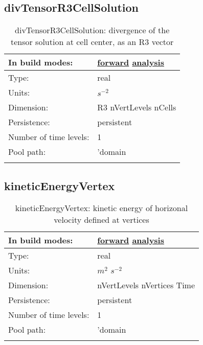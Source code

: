 \subsection[divTensorR3CellSolution]{divTensorR3CellSolution}
\label{subsec:var_sec_scratch_divTensorR3CellSolution}
\begin{center}
\begin{longtable}{| p{2.0in} | p{4.0in} |}
        \hline 
        In build modes: & \hyperref[subsec:forward_var_tab_scratch]{forward} \hyperref[subsec:analysis_var_tab_scratch]{analysis} \\
        \hline 
        Type: & real \\
        \hline 
        Units: & $s^{-2}$ \\
        \hline 
        Dimension: & R3 nVertLevels nCells \\
        \hline 
        Persistence: & persistent \\
        \hline 
        Number of time levels: & 1 \\
        \hline 
            Pool path: & 'domain %
 \\
		 \hline 
    \caption{divTensorR3CellSolution: divergence of the tensor solution at cell center, as an R3 vector}
\end{longtable}
\end{center}
\subsection[kineticEnergyVertex]{kineticEnergyVertex}
\label{subsec:var_sec_scratch_kineticEnergyVertex}
\begin{center}
\begin{longtable}{| p{2.0in} | p{4.0in} |}
        \hline 
        In build modes: & \hyperref[subsec:forward_var_tab_scratch]{forward} \hyperref[subsec:analysis_var_tab_scratch]{analysis} \\
        \hline 
        Type: & real \\
        \hline 
        Units: & $m^2$ $s^{-2}$ \\
        \hline 
        Dimension: & nVertLevels nVertices Time \\
        \hline 
        Persistence: & persistent \\
        \hline 
        Number of time levels: & 1 \\
        \hline 
            Pool path: & 'domain %
 \\
		 \hline 
    \caption{kineticEnergyVertex: kinetic energy of horizonal velocity defined at vertices}
\end{longtable}
\end{center}
